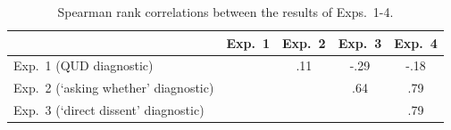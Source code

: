 \documentclass[times,linguex,xcolor]{glossa}
\begin{document}
 \begin{table}[ht!]
 \centering
 \begin{tabular}{l | c c c c}
 & Exp.~1 & Exp.~2 & Exp.~3 & Exp.~4 \\ \hline
 Exp.~1 (QUD diagnostic) & \cellcolor{lightgray} & .11 & -.29 & -.18 \\
 Exp.~2 (`asking whether' diagnostic) & \cellcolor{lightgray} & \cellcolor{lightgray} & .64 &.79 \\
 Exp.~3 (`direct dissent' diagnostic) & \cellcolor{lightgray}& \cellcolor{lightgray} & \cellcolor{lightgray} & .79  \\
 \hline
 \end{tabular}
 \caption{Spearman rank correlations between the results of Exps.~1-4.}\label{t:spearman}
 \end{table}
  
\end{document}
